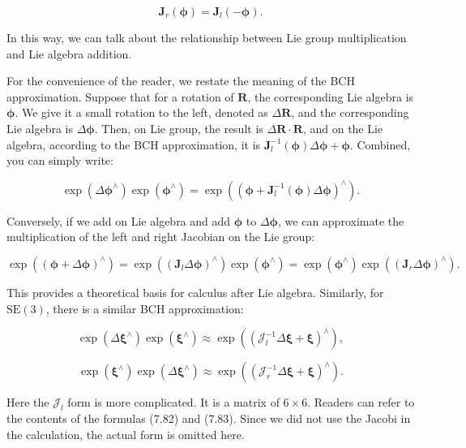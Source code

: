 \begin{equation}
\bm{J}_r(\boldsymbol{\phi}) =\bm{J}_l(-\boldsymbol{\phi}) .
\end{equation}

In this way, we can talk about the relationship between Lie group multiplication and Lie algebra addition.

For the convenience of the reader, we restate the meaning of the BCH approximation. Suppose that for a rotation of $\bm{R}$, the corresponding Lie algebra is $\boldsymbol{\phi}$. We give it a small rotation to the left, denoted as $\Delta \bm{R}$, and the corresponding Lie algebra is $\Delta \boldsymbol{\phi}$. Then, on Lie group, the result is $ \Delta \bm{R} \cdot \bm{R}$, and on the Lie algebra, according to the BCH approximation, it is $\bm{J}_l^{-1 } (\boldsymbol{\phi}) \Delta \boldsymbol{\phi} + \boldsymbol{\phi}$. Combined, you can simply write:

\begin{equation}
\exp \left( {\Delta { \boldsymbol{\phi} ^ \wedge }} \right)\exp \left( {{ \boldsymbol{\phi} ^ \wedge }} \right) = \exp \left( {{{\left( { \boldsymbol{\phi} + \bm{J}_l^{ - 1}\left( \boldsymbol{\phi} \right)\Delta \boldsymbol{\phi} } \right)} ^ \wedge }} \right).
\end{equation}

Conversely, if we add on Lie algebra and add $\boldsymbol{\phi}$ to $\Delta \boldsymbol{\phi}$, we can approximate the multiplication of the left and right Jacobian on the Lie group:

\begin{equation}
\exp \left( {{{\left( { \boldsymbol{\phi}  + \Delta \boldsymbol{\phi} } \right)}^ \wedge }} \right) = \exp \left( {{{\left( {{ \bm{J}_l}\Delta \boldsymbol{\phi} } \right)}^ \wedge }} \right)\exp \left( {{ \boldsymbol{\phi} ^ \wedge }} \right) = \exp \left( {{\boldsymbol{\phi} ^ \wedge }} \right)\exp \left( {{{\left( {{\bm{J}_r}\Delta \boldsymbol{\phi} } \right)}^ \wedge }} \right).
\end{equation}

This provides a theoretical basis for calculus after Lie algebra. Similarly, for $\mathrm{SE}(3)$, there is a similar BCH approximation:

\begin{equation}
\exp \left( {\Delta {\boldsymbol{\xi} ^ \wedge }} \right)\exp \left( {{ \boldsymbol{\xi} ^ \wedge }} \right) \approx \exp \left ( {{{\left( {{ \bm{\mathcal{J}}_l^{-1} }\Delta \boldsymbol{\xi} + \boldsymbol{\xi} } \right)}^ \wedge }} \right),
\end{equation}

\begin{equation}
\exp \left( {{ \boldsymbol{\xi} ^ \wedge }} \right) \exp \left( {\Delta {\boldsymbol{\xi} ^ \wedge }} \right) \approx \exp \left ( {{{\left( {{ \bm{\mathcal{J}}_r^{-1} }\Delta \boldsymbol{\xi} + \boldsymbol{\xi} } \right)}^ \wedge }} \right).
\end{equation}

Here the $\bm{\mathcal{J}}_l$ form is more complicated. It is a matrix of $6 \times 6$. Readers can refer to the contents of the \cite{Barfoot2016} formulas (7.82) and (7.83). Since we did not use the Jacobi in the calculation, the actual form is omitted here.
